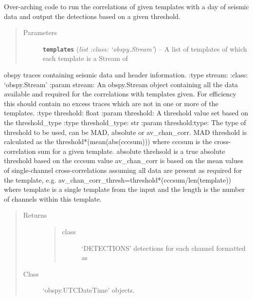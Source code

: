 \documentclass[a4paper,10pt,english]{sphinxmanual}
\begin{document}
\begin{fulllineitems}
\label{modules:match_filter.match_filter}
Over-arching code to run the correlations of given templates with a day of
seismic data and output the detections based on a given threshold.
\begin{quote}\begin{description}
\item[{Parameters}] \leavevmode
\textbf{\texttt{templates}} (\emph{list :class: `obspy.Stream'}) -- A list of templates of which each template is a Stream of

\end{description}\end{quote}

obspy traces containing seismic data and header information.
:type stream: :class: `obspy.Stream'
:param stream: An obspy.Stream object containing all the data available and
required for the correlations with templates given.  For efficiency this
should contain no excess traces which are not in one or more of the
templates.
:type threshold: float
:param threshold: A threshold value set based on the threshold\_type
:type threshold\_type: str
:param threshold:type: The type of threshold to be used, can be MAD,
absolute or av\_chan\_corr.
MAD threshold is calculated as the
threshold*(mean(abs(cccsum))) where cccsum is the cross-correlation sum
for a given template.
absolute threhsold is a true absolute threshold based on the cccsum value
av\_chan\_corr is based on the mean values of single-channel
cross-correlations assuming all data are present as required for the
template, e.g. av\_chan\_corr\_thresh=threshold*(cccsum/len(template)) where
template is a single template from the input and the length is the number
of channels within this template.
\begin{quote}\begin{description}
\item[{Returns}] \leavevmode
\begin{quote}\begin{description}
\item[{class}] \leavevmode
`DETECTIONS' detections for each channel formatted as

\end{description}\end{quote}


\item[{Class}] \leavevmode
`obspy.UTCDateTime' objects.

\end{description}\end{quote}

\end{fulllineitems}
\end{document}
